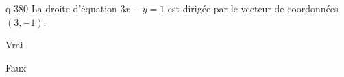 \begin{truefalse}{q-380}
La droite d'équation $3x-y=1$ est dirigée par le vecteur de coordonnées $(3,-1)$.
\item Vrai
\item* Faux
\end{truefalse}

